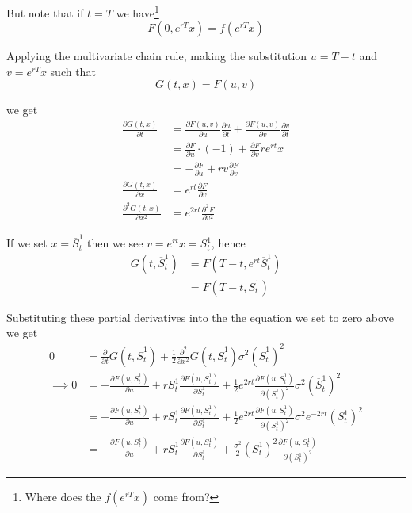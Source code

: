 \documentclass[12pt]{article}
\newlength\tindent
\renewcommand{\indent}{\hspace*{\tindent}}
\begin{document}
But note that if $t = T$ we have\footnote{Where does the $f(e^{rT}x)$ come from?}
\begin{equation*}
	F(0, e^{rT}x) = f(e^{rT}x)
\end{equation*}

\indent Applying the multivariate chain rule, making the substitution $u = T - t$ and $v = e^{rT}x$ such that
\begin{equation*}
	G(t,x) = F(u,v)
\end{equation*}

we get
\begin{align*}
	\frac{\partial G(t,x)}{\partial t} &= \frac{\partial F(u,v)}{\partial u}\frac{\partial u}{\partial t} + \frac{\partial F(u,v)}{\partial v}\frac{\partial v}{\partial t} \\
	&= \frac{\partial F}{\partial u}\cdot(-1) + \frac{\partial F}{\partial v} re^{rt}x \\
	&= -\frac{\partial F}{\partial u} + rv\frac{\partial F}{\partial v} \\
	\frac{\partial G(t,x)}{\partial x} &= e^{rt}\frac{\partial F}{\partial v} \\
	\frac{\partial^2 G(t,x)}{\partial x^2} &= e^{2rt}\frac{\partial^2 F}{\partial v^2}
\end{align*}

If we set $x = \overline{S}^1_t$ then we see $v = e^{rt}x = S^1_t$, hence
\begin{align*}
	G(t,\overline{S}^1_t) &= F(T - t,e^{rt}\overline{S}^1_t) \\
	&= F(T - t,S^1_t)
\end{align*}

Substituting these partial derivatives into the the equation we set to zero above we get
\begin{align*}
	0 &= \frac{\partial}{\partial t}G(t,\overline{S}^1_t) + \frac{1}{2}\frac{\partial^2}{\partial x^2}G(t,\overline{S}^1_t)\sigma^2(\overline{S}^1_t)^2 \\
	\implies 0 &= -\frac{\partial F(u, S^1_t)}{\partial u} + rS^1_t\frac{\partial F(u, S^1_t)}{\partial S^1_t} + \frac{1}{2}e^{2rt}\frac{\partial F(u, S^1_t)}{\partial (S^1_t)^2}\sigma^2(\overline{S}^1_t)^2 \\
	&= -\frac{\partial F(u, S^1_t)}{\partial u} + rS^1_t\frac{\partial F(u, S^1_t)}{\partial S^1_t} + \frac{1}{2}e^{2rt}\frac{\partial F(u, S^1_t)}{\partial (S^1_t)^2}\sigma^2e^{-2rt}(S^1_t)^2 \\
	&= -\frac{\partial F(u, S^1_t)}{\partial u} + rS^1_t\frac{\partial F(u, S^1_t)}{\partial S^1_t} + \frac{\sigma^2}{2}(S^1_t)^2 \frac{\partial F(u, S^1_t)}{\partial (S^1_t)^2}
\end{align*}
\end{document}
